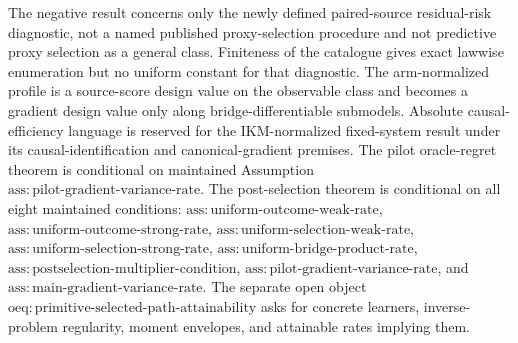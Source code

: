 The negative result concerns only the newly defined paired-source residual-risk diagnostic, not a named published proxy-selection procedure and not predictive proxy selection as a general class.  Finiteness of the catalogue gives exact lawwise enumeration but no uniform constant for that diagnostic.  The arm-normalized profile is a source-score design value on the observable class and becomes a gradient design value only along bridge-differentiable submodels.  Absolute causal-efficiency language is reserved for the IKM-normalized fixed-system result under its causal-identification and canonical-gradient premises.  The pilot oracle-regret theorem is conditional on maintained Assumption~\(\mathrm{ass{:}pilot\text{-}gradient\text{-}variance\text{-}rate}\).  The post-selection theorem is conditional on all eight maintained conditions: \(\mathrm{ass{:}uniform\text{-}outcome\text{-}weak\text{-}rate}\), \(\mathrm{ass{:}uniform\text{-}outcome\text{-}strong\text{-}rate}\), \(\mathrm{ass{:}uniform\text{-}selection\text{-}weak\text{-}rate}\), \(\mathrm{ass{:}uniform\text{-}selection\text{-}strong\text{-}rate}\), \(\mathrm{ass{:}uniform\text{-}bridge\text{-}product\text{-}rate}\), \(\mathrm{ass{:}postselection\text{-}multiplier\text{-}condition}\), \(\mathrm{ass{:}pilot\text{-}gradient\text{-}variance\text{-}rate}\), and \(\mathrm{ass{:}main\text{-}gradient\text{-}variance\text{-}rate}\).  The separate open object \(\mathrm{oeq{:}primitive\text{-}selected\text{-}path\text{-}attainability}\) asks for concrete learners, inverse-problem regularity, moment envelopes, and attainable rates implying them.
